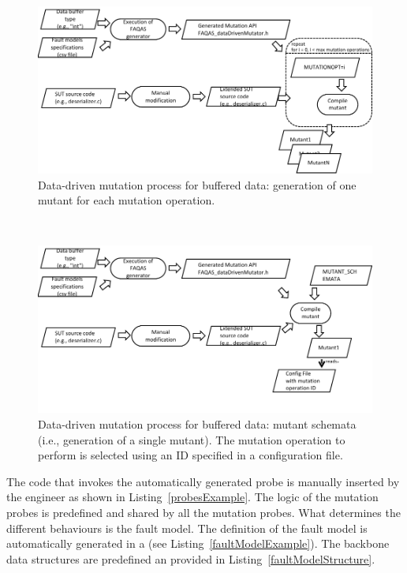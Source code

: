 \begin{figure}[h]
  \centering
    \includegraphics[width=14cm]{images/dataDrivenBufferProcess}
      \caption{Data-driven mutation process for buffered data: generation of one mutant for each mutation operation.}
      \label{fig:DataDrivenBufferProcess}
\end{figure}~\begin{figure}[h]
  \centering
    \includegraphics[width=14cm]{images/dataDrivenBufferProcess_ALT}
      \caption{Data-driven mutation process for buffered data: mutant schemata (i.e., generation of a single mutant). The mutation operation to perform is selected using an ID specified in a configuration file.}
      \label{fig:DataDrivenBufferProcessALT}
\end{figure}

\clearpage


The code that invokes the automatically generated probe is manually inserted by the engineer as shown in Listing~\ref{probesExample}.
The logic of the mutation probes is predefined and shared by all the mutation probes. What determines the different behaviours is the fault model.
The definition of the fault model is automatically generated in a  (see Listing~\ref{faultModelExample}). 
The backbone data structures are predefined an provided in Listing~\ref{faultModelStructure}.

